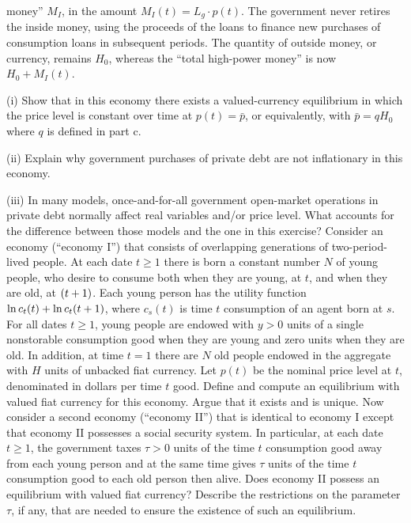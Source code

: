 money'' $M_I$, in the amount $M_I(t)=L_g\cdot p(t)$.  The
government never retires the inside money, using the proceeds of
the loans to finance new purchases of consumption loans in
subsequent periods.  The quantity of outside money, or currency,
remains $H_0$, whereas the ``total high-power money'' is now
$H_0+M_I(t)$. \item{(i)} Show that in this economy there
exists a valued-currency equilibrium in which the price level is
constant over time at $p(t)=\bar p$, or equivalently, with $\bar
p=qH_0$ where $q$ is defined in part c. \item{(ii)} Explain
why government purchases of private debt are not inflationary in
this economy. \item{(iii)} In many models,
once-and-for-all government open-market operations in private debt
normally affect real variables and/or price level.  What accounts
for the difference between those models and the one in this
exercise?
\newpage
\medskip
{}
\medskip
\noindent Consider an economy (``economy I'') that consists of overlapping generations of
two-period-lived people.  At each date $t\ge 1$ there is born a constant
number $N$ of young people, who desire to consume both when they are young, at
$t$, and when they are old, at $({t+1})$.  Each young person has the utility
function $\ln c_t(t)+\ln c_t({t+1})$, where $c_s(t)$ is time $t$ consumption of
an agent born at $s$.  For all dates $t\ge 1$, young people are endowed with
$y>0$ units of a single nonstorable consumption good when they are young and
zero units when they are old.  In addition, at time $t=1$ there are $N$ old
people endowed in the aggregate with $H$ units of unbacked fiat currency.  Let
$p(t)$ be the nominal price level at $t$, denominated in dollars per time $t$
good.
\medskip{}
 Define and compute an equilibrium with valued fiat currency for this
economy.  Argue that it exists and is unique.  Now consider a second economy
(``economy II'') that is identical to economy I except that economy II
possesses a social security system.  In particular, at each date $t\ge 1$, the
government taxes $\tau>0$ units of the time $t$ consumption good away from each
young person and at the same time gives $\tau$ units of the time $t$
consumption good to each old person then alive.
\medskip{} Does economy II possess an equilibrium with valued fiat currency?
Describe the restrictions on the parameter $\tau$, if any, that are needed to
ensure the existence of such an equilibrium.
